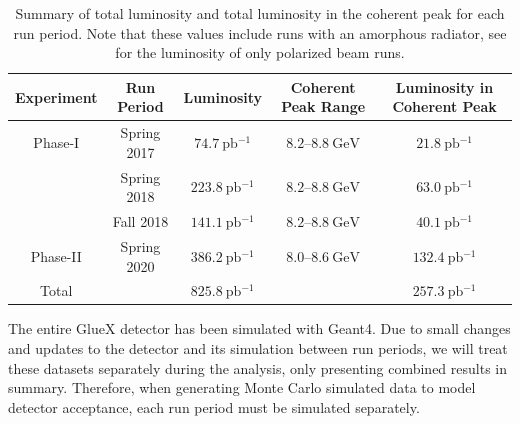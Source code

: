 \begin{table}
  \begin{center}
    \begin{tabular}{ccccc}\toprule
      Experiment & Run Period & Luminosity & Coherent Peak Range & Luminosity in Coherent Peak \\\midrule
      Phase-I & Spring 2017 & $\SI{74.7}{\pico\barn^{-1}}$ & $8.2$--$\SI{8.8}{\giga\eV}$ & $\SI{21.8}{\pico\barn^{-1}}$ \\
              & Spring 2018 & $\SI{223.8}{\pico\barn^{-1}}$ & $8.2$--$\SI{8.8}{\giga\eV}$ & $\SI{63.0}{\pico\barn^{-1}}$ \\
              & Fall 2018 & $\SI{141.1}{\pico\barn^{-1}}$ & $8.2$--$\SI{8.8}{\giga\eV}$ & $\SI{40.1}{\pico\barn^{-1}}$ \\\midrule
      Phase-II & Spring 2020 & $\SI{386.2}{\pico\barn^{-1}}$ & $8.0$--$\SI{8.6}{\giga\eV}$ & $\SI{132.4}{\pico\barn^{-1}}$ \\\midrule
      Total & & $\SI{825.8}{\pico\barn^{-1}}$ & & $\SI{257.3}{\pico\barn^{-1}}$ \\\bottomrule
    \end{tabular}
    \caption{Summary of total luminosity and total luminosity in the coherent peak for each run period. Note that these values include runs with an amorphous radiator, see  for the luminosity of only polarized beam runs.}\label{tab:run-info}
  \end{center}
\end{table}

The entire GlueX detector has been simulated with Geant4. Due to small changes and updates to the detector and its simulation between run periods, we will treat these datasets separately during the analysis, only presenting combined results in summary. Therefore, when generating Monte Carlo simulated data to model detector acceptance, each run period must be simulated separately.
